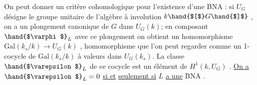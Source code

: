 On peut donner un critère cohomologique pour l'existence d'une BNA : si
$U_G$ désigne le groupe unitaire de l'algèbre à involution $k\hand{$[$}G\hand{$]$}$ , on a un
plongement canonique de $G$ dans $U_G(k)$; en composant $\hand{$\varphi$}_L$ avec ce plongement
on obtient un homomorphisme $\mathrm{Gal}(k_s/k) \to U_G(k)$ , homomorphisme que l'on peut
regarder comme un 1-cocycle de $\mathrm{Gal}(k_s/k)$ à valeurs dans $U_G(k_s)$. La classe
$\hand{$\varepsilon$}_L$ de ce cocycle est un élément de $H^1(k, U_G)$ . \uline{On a} $\hand{$\varepsilon$}_L = 0$ \uline{si et}
\uline{seulement si} $L$ \uline{a une} BNA .

